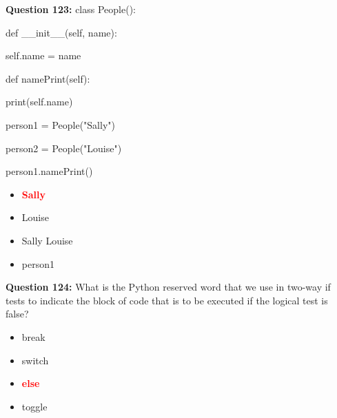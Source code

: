\documentclass[12pt,a4paper]{article}
\begin{document}
\vspace{0.5cm}

\textbf{Question 123:} class People():\newline

\newline
    def __init__(self, name):\newline

\newline
        self.name = name\newline

\newline
\newline

\newline
    def namePrint(self):\newline

\newline
        print(self.name)\newline

\newline
\newline

\newline
person1 = People("Sally")\newline

\newline
person2 = People("Louise")\newline

\newline
person1.namePrint()

\begin{itemize}
    \item[\textbf{A.}] \textcolor{red}{\textbf{Sally}}
    \item[\textbf{B.}] Louise
    \item[\textbf{C.}] Sally Louise
    \item[\textbf{D.}] person1
\end{itemize}

\vspace{0.5cm}

\textbf{Question 124:} What is the Python reserved word that we use in two-way if tests to indicate the block of code that is to be executed if the logical test is false?

\begin{itemize}
    \item[\textbf{A.}] break
    \item[\textbf{B.}] switch
    \item[\textbf{C.}] \textcolor{red}{\textbf{else}}
    \item[\textbf{D.}] toggle
\end{itemize}
\end{document}
